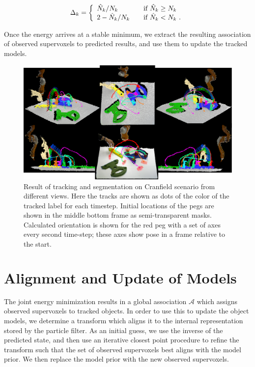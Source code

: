 \begin{equation}
\label{eqn:DeltaSVs}
\Delta_k = \left\{ 
  \begin{array}{l l}
    {\hat{N}_k}/{N_k} & \quad \text{if ${\hat{N}_k} \geq {{N}_k}$ }\\
    2 - {\hat{N}_k}/{N_k} & \quad \text{if $\hat{N}_k < {N}_k$}~. 
  \end{array} \right.  
\end{equation}

Once the energy arrives at a stable minimum, we extract the resulting association of observed supervoxels to predicted results, and use them to update the tracked models.

\begin{figure}[!ht]
  \centering
  \includegraphics[width=\linewidth]{figures/IROS2013/TrajectoriesNew.pdf}
  \caption[Cranfield Tracking Results]{Result of tracking and segmentation on Cranfield scenario from different views. Here the tracks are shown as dots of the color of the tracked label for each timestep. Initial locations of the pegs are shown in the middle bottom frame as semi-transparent masks. Calculated orientation is shown for the red peg with a set of axes every second time-step; these axes show pose in a frame relative to the start. }
  \label{fig:Trajectories}
\end{figure}

\section{Alignment and Update of Models}
The joint energy minimization results in a global association $\mathcal{A}$ which assigns observed supervoxels to tracked objects. In order to use this to update the object models, we determine a transform which aligns it to the internal representation stored by the particle filter. As an initial guess, we use the inverse of the predicted state, and then use an iterative closest point \cite{ICPChetverikov} procedure to refine the transform such that the set of observed supervoxels best aligns with the model prior. We then replace the model prior with the new observed supervoxels. 

